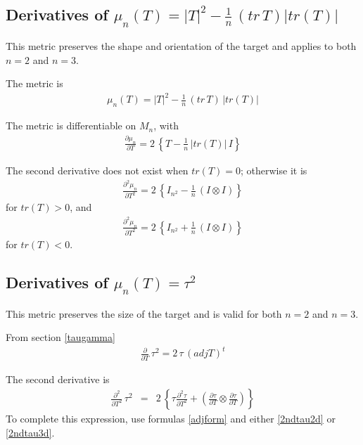 \documentclass{report}
\begin{document}
\subsection{Derivatives of $\mu_n(T)=|T|^2 - \frac{1}{n} \, (tr \, T) |tr(T)|$ \label{si+}}

This metric preserves the shape and orientation of the target and applies 
to both $n=2$ and $n=3$. \newline

\noindent The metric is
\begin{eqnarray}
\mu_n(T)=|T|^2 - \frac{1}{n} \, (tr \, T) \, |tr(T)|
\end{eqnarray}

\noindent The metric is differentiable on $M_n$, with
\begin{eqnarray}
\frac{\partial \mu_n}{\partial T} = 2 \, \left\{ T - \frac{1}{n} \, |tr(T)| \, I \right\} \label{derv1-si+}
\end{eqnarray}

\noindent The second derivative does not exist when $tr(T)=0$; otherwise 
it is  
\begin{eqnarray}
\frac{\partial^2 \mu_n}{\partial T^2} = 2 \, \left\{ I_{n^2} - \frac{1}{n} \, \left( I \otimes I \right) \right\}
\end{eqnarray}
for $tr(T) > 0$, and 
\begin{eqnarray}
\frac{\partial^2 \mu_n}{\partial T^2} = 2 \, \left\{ I_{n^2} + \frac{1}{n} \, \left( I \otimes I \right) \right\}
\end{eqnarray}
for $tr(T) < 0$. \newline

\subsection{Derivatives of $\mu_n(T) = \tau^2$}

\noindent This metric preserves the size of the target and is valid for both $n=2$ and $n=3$. \newline

\noindent From section \ref{taugamma}
\begin{eqnarray}
\frac{\partial}{\partial T} \, \tau^2 = 2 \, \tau \, (adj T)^t
\end{eqnarray}

\noindent The second derivative is
\begin{eqnarray}
\frac{\partial^2}{\partial T^2} \, \tau^2 & = & 2 \, \left\{ \tau \frac{\partial^2 \tau}{\partial T^2} + \left( \frac{\partial \tau}{\partial T} \otimes \frac{\partial \tau}{\partial T} \right) \right\}
\end{eqnarray}
To complete this expression, use formulas \ref{adjform} and either 
\ref{2ndtau2d} or \ref{2ndtau3d}. \newline
\end{document}
